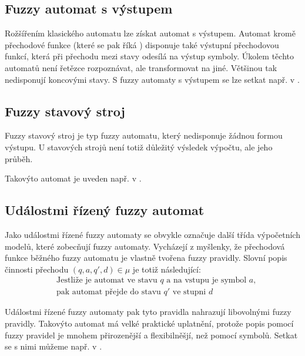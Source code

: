 \subsection{Fuzzy automat s výstupem}
Rožšířením klasického automatu lze získat automat s výstupem. Automat kromě přechodové funkce (které se pak říká ) disponuje také výstupní přechodovou funkcí, která při přechodu mezi stavy odesílá na výstup symboly. Úkolem těchto automatů není řetězce rozpoznávat, ale transformovat na jiné. Většinou tak nedisponují koncovými stavy. S fuzzy automaty s výstupem se lze setkat např. v \cite{BlaDelPeg-FuzzAutIndUsNeuNet, PedGac-LeaFuzzAut, BlaDelPeg-FuzzGraIntUsiNeuNet, CheMo-MinAlgFuzFinAut, ThoMar-DetAccRegFuzLang}.

\subsection{Fuzzy stavový stroj}
Fuzzy stavový stroj je typ fuzzy automatu, který nedisponuje žádnou formou výstupu. U stavových strojů není totiž důležitý výsledek výpočtu, ale jeho průběh. 

Takovýto automat je uveden např. v \cite{Qiu-ChaFuzFinAut, AlvJoaCru-FuStMaAppEmoModEleGamCha}.

\subsection{Událostmi řízený fuzzy automat} \label{subsec:FuzzEvMach}
Jako událostmi řízené fuzzy automaty se obvykle označuje další třída výpočetních modelů, které zobecňují fuzzy automaty. Vycházejí z myšlenky, že přechodová funkce běžného fuzzy automatu je vlastně tvořena fuzzy \ifthen pravidly. Slovní popis činnosti přechodu $(q, a, q', d) \in \mu$ je totiž následující:
\begin{align*}
 &\text{Jestliže je automat ve stavu $q$ a na vstupu je symbol $a$,} \\
 &\text{pak automat přejde do stavu $q'$ ve stupni $d$ }
\end{align*}

Událostmi řízené fuzzy automaty pak tyto pravidla nahrazují libovolnými fuzzy \ifthen pravidly. Takovýto automat má velké praktické uplatnění, protože popis pomocí fuzzy \ifthen pravidel je mnohem přirozenější a flexibilněšjí, než pomocí symbolů. Setkat se s nimi můžeme např. v \cite{TriHei-ExpDesSeqFuzPer, AlvJoaCru-FuStMaAppEmoModEleGamCha, TzaRig-StaAnaAdaFuzzConSysUsiPetrNetLeaAut}.

